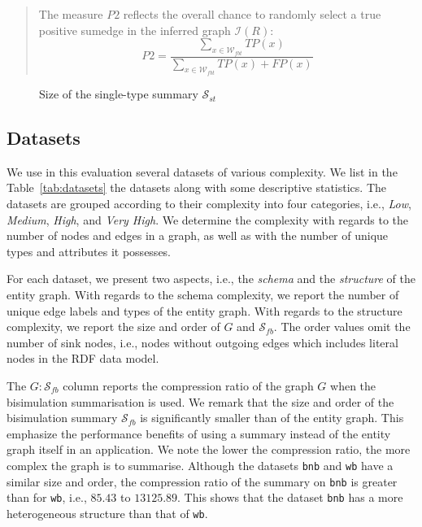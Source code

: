 \begin{quotation}
	The measure $P2$ reflects the overall chance to randomly select a true positive sumedge in the inferred graph $\mathcal{I}(R)$:
	$$
	P2 = \frac{\sum_{x \in \mathcal{W}_{fbt}}{TP(x)}}{\sum_{x \in \mathcal{W}_{fbt}}{TP(x) + FP(x)}}
	$$
\end{quotation}

\begin{figure}
	\centering
	\resizebox{.8\textwidth}{!}{
		
	}
	\caption{Size of the single-type summary $\mathcal{S}_{st}$}
	\label{fig:single-type-summary-size}
\end{figure}
\subsection{Datasets}
\label{sec:eval:datasets}

We use in this evaluation several datasets of various complexity. We list in the Table~\ref{tab:datasets} the datasets along with some descriptive statistics. The datasets are grouped according to their complexity into four categories, i.e., \emph{Low}, \emph{Medium}, \emph{High}, and \emph{Very High}. We determine the complexity with regards to the number of nodes and edges in a graph, as well as with the number of unique types and attributes it possesses.

For each dataset, we present two aspects, i.e., the \emph{schema} and the \emph{structure} of the entity graph. With regards to the schema complexity, we report the number of unique edge labels and types of the entity graph. With regards to the structure complexity, we report the size and order of $G$ and  $\mathcal{S}_{fb}$. The order values omit the number of sink nodes, i.e., nodes without outgoing edges which includes literal nodes in the RDF data model.

The $G:\mathcal{S}_{fb}$ column reports the compression ratio of the graph $G$ when the bisimulation summarisation is used. We remark that the size and order of the bisimulation summary $\mathcal{S}_{fb}$ is significantly smaller than of the entity graph. This emphasize the performance benefits of using a summary instead of the entity graph itself in an application. We note the lower the compression ratio, the more complex the graph is to summarise. Although the datasets \texttt{bnb} and \texttt{wb} have a similar size and order, the compression ratio of the summary on \texttt{bnb} is greater than for \texttt{wb}, i.e., $85.43$ to $13125.89$. This shows that the dataset \texttt{bnb} has a more heterogeneous structure than that of \texttt{wb}.

